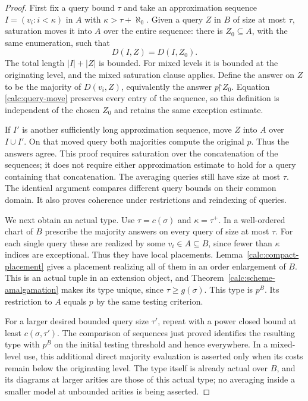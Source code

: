\begin{proof}
First fix a query bound $\tau$ and take an approximation sequence
$I=(v_i:i<\kappa)$ in $A$ with $\kappa>\tau+\aleph_0$.  Given a
query $Z$ in $B$ of size at most $\tau$, saturation moves it into $A$
over the entire sequence: there is $Z_0\subseteq A$, with the same
enumeration, such that
\begin{equation}
\label{calc:query-move}
 D(I,Z)=D(I,Z_0).
\end{equation}
The total length $|I|+|Z|$ is bounded.  For mixed levels it is bounded
at the originating level, and the mixed saturation clause applies.
Define the answer on $Z$ to be the majority of $D(v_i,Z)$, equivalently
the answer $p\mathord\upharpoonright Z_0$.  Equation
\eqref{calc:query-move} preserves every entry of the sequence, so this
definition is independent of the chosen $Z_0$ and retains the same
exception estimate.

If $I'$ is another sufficiently long approximation sequence, move $Z$
into $A$ over $I\cup I'$.  On that moved query both majorities compute
the original $p$.  Thus the answers agree.  This proof requires
saturation over the concatenation of the sequences; it does not
require either approximation estimate to hold for a query containing
that concatenation.  The averaging queries still have size at most
$\tau$.  The identical argument compares different query bounds on
their common domain.  It also proves coherence under restrictions and
reindexing of queries.

We next obtain an actual type.  Use
$\tau=c(\sigma)$ and $\kappa=\tau^+$.  In a well-ordered chart of $B$
prescribe the majority answers on every query of size at most $\tau$.
For each single query these are realized by some $v_i\in A\subseteq B$,
since fewer than $\kappa$ indices are exceptional.  Thus they have
local placements.  Lemma~\ref{calc:compact-placement} gives a placement
realizing all of them in an order enlargement of $B$.  This is an
actual tuple in an extension object, and
Theorem~\ref{calc:scheme-amalgamation} makes its type unique, since
$\tau\ge g(\sigma)$.  This type is $p^B$.  Its restriction to $A$
equals $p$ by the same testing criterion.

For a larger desired bounded query size $\tau'$, repeat with a power
closed bound at least $c(\sigma,\tau')$.  The comparison of sequences
just proved identifies the resulting type with $p^B$ on the initial
testing threshold and hence everywhere.  In a mixed-level use, this
additional direct majority evaluation is asserted only when its costs
remain below the originating level.  The type itself is already
actual over $B$, and its diagrams at larger arities are those of this
actual type; no averaging inside a smaller model at unbounded arities
is being asserted.


\end{proof}
